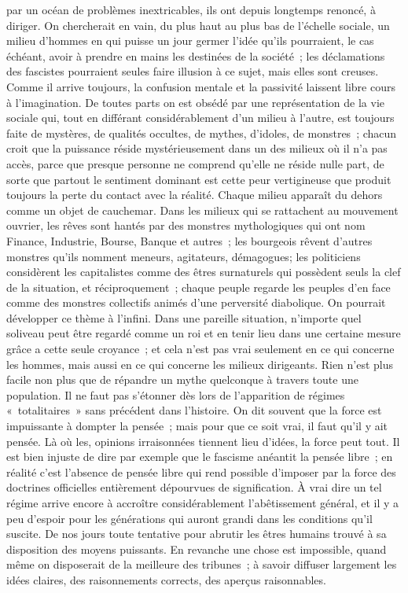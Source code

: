 \documentclass[french,twoside]{book} %
\begin{document}
par un océan de problèmes inextricables, ils ont depuis longtemps renoncé, à diriger. On chercherait en vain, du plus haut au plus bas de l'échelle sociale, un milieu d'hommes en qui puisse un jour germer l'idée qu'ils pourraient, le cas échéant, avoir à prendre en mains les destinées de la société ; les déclamations des fascistes pourraient seules faire illusion à ce sujet, mais elles sont creuses. Comme il arrive toujours, la confusion mentale et la passivité laissent libre cours à l'imagination. De toutes parts on est obsédé par une représentation de la vie sociale qui, tout en différant considérablement d'un milieu à l'autre, est toujours faite de mystères, de qualités occultes, de mythes, d'idoles, de monstres ; chacun croit que la puissance réside mystérieusement dans un des milieux où il n'a pas accès, parce que presque personne ne comprend qu'elle ne réside nulle part, de sorte que partout le sentiment dominant est cette peur vertigineuse que produit toujours la perte du contact avec la réalité. Chaque milieu apparaît du dehors comme un objet de cauchemar. Dans les milieux qui se rattachent au mouvement ouvrier, les rêves sont hantés par des monstres mythologiques qui ont nom Finance, Industrie, Bourse, Banque et autres ; les bourgeois rêvent d'autres monstres qu'ils nomment meneurs, agitateurs, démagogues; les politiciens considèrent les capitalistes comme des êtres surnaturels qui possèdent seuls la clef de la situation, et réciproquement ; chaque peuple regarde les peuples d'en face comme des monstres collectifs animés d'une perversité diabolique. On pourrait développer ce thème à l'infini. Dans une pareille situation, n'importe quel soliveau peut être regardé comme un roi et en tenir lieu dans une certaine mesure grâce a cette seule croyance ; et cela n'est pas vrai seulement en ce qui concerne les hommes, mais aussi en ce qui concerne les milieux dirigeants. Rien n'est plus facile non plus que de répandre un mythe quelconque à travers toute une population. Il ne faut pas s'étonner dès lors de l'apparition de régimes « totalitaires » sans précédent dans l'histoire. On dit souvent que la force est impuissante à dompter la pensée ; mais pour que ce soit vrai, il faut qu'il y ait pensée. Là où les, opinions irraisonnées tiennent lieu d'idées, la force peut tout. Il est bien injuste de dire par exemple que le fascisme anéantit la pensée libre ; en réalité c'est l'absence de pensée libre qui rend possible d'imposer par la force des doctrines officielles entièrement dépourvues de signification. À vrai dire un tel régime arrive encore à accroître considérablement l'abêtissement général, et il y a peu d'espoir pour les générations qui auront grandi dans les conditions qu'il suscite. De nos jours toute tentative pour abrutir les êtres humains trouvé à sa disposition des moyens puissants. En revanche une chose est impossible, quand même on disposerait de la meilleure des tribunes ; à savoir diffuser largement les idées claires, des raisonnements corrects, des aperçus raisonnables.\par
\end{document}
